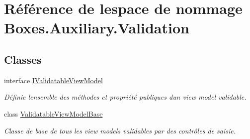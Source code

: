 \hypertarget{namespace_boxes_1_1_auxiliary_1_1_validation}{}\section{Référence de l\textquotesingle{}espace de nommage Boxes.\+Auxiliary.\+Validation}
\label{namespace_boxes_1_1_auxiliary_1_1_validation}
\subsection*{Classes}
\begin{DoxyCompactItemize}
\item 
interface \hyperlink{interface_boxes_1_1_auxiliary_1_1_validation_1_1_i_validatable_view_model}{I\+Validatable\+View\+Model}
\begin{DoxyCompactList}\small\item\em Définie l\textquotesingle{}ensemble des méthodes et propriété publiques d\textquotesingle{}un view model validable. \end{DoxyCompactList}\item 
class \hyperlink{class_boxes_1_1_auxiliary_1_1_validation_1_1_validatable_view_model_base}{Validatable\+View\+Model\+Base}
\begin{DoxyCompactList}\small\item\em Classe de base de tous les view models validables par des contrôles de saisie. \end{DoxyCompactList}\end{DoxyCompactItemize}
